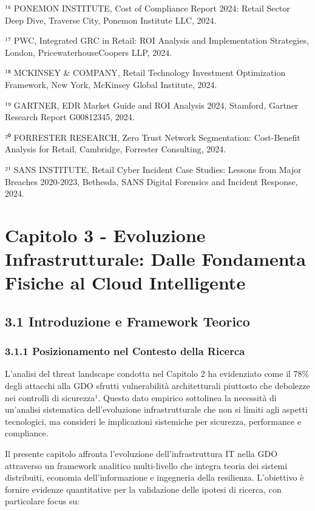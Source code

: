 \documentclass[12pt,a4paper,oneside]{book}
\numberwithin{figure}{chapter} %
\numberwithin{table}{chapter}  %
\begin{document}
¹⁶ PONEMON INSTITUTE, Cost of Compliance Report 2024: Retail Sector Deep
Dive, Traverse City, Ponemon Institute LLC, 2024.

¹⁷ PWC, Integrated GRC in Retail: ROI Analysis and Implementation
Strategies, London, PricewaterhouseCoopers LLP, 2024.

¹⁸ MCKINSEY \& COMPANY, Retail Technology Investment Optimization
Framework, New York, McKinsey Global Institute, 2024.

¹⁹ GARTNER, EDR Market Guide and ROI Analysis 2024, Stamford, Gartner
Research Report G00812345, 2024.

²⁰ FORRESTER RESEARCH, Zero Trust Network Segmentation: Cost-Benefit
Analysis for Retail, Cambridge, Forrester Consulting, 2024.

²¹ SANS INSTITUTE, Retail Cyber Incident Case Studies: Lessons from
Major Breaches 2020-2023, Bethesda, SANS Digital Forensics and Incident
Response, 2024.

\chapter{Capitolo 3 - Evoluzione Infrastrutturale: Dalle Fondamenta
Fisiche al Cloud
Intelligente}\label{capitolo-3---evoluzione-infrastrutturale-dalle-fondamenta-fisiche-al-cloud-intelligente}

\section{3.1 Introduzione e Framework
Teorico}\label{introduzione-e-framework-teorico}

\subsection{3.1.1 Posizionamento nel Contesto della
Ricerca}\label{posizionamento-nel-contesto-della-ricerca}

L'analisi del threat landscape condotta nel Capitolo 2 ha evidenziato
come il 78\% degli attacchi alla GDO sfrutti vulnerabilità
architetturali piuttosto che debolezze nei controlli di sicurezza¹.
Questo dato empirico sottolinea la necessità di un'analisi sistematica
dell'evoluzione infrastrutturale che non si limiti agli aspetti
tecnologici, ma consideri le implicazioni sistemiche per sicurezza,
performance e compliance.

Il presente capitolo affronta l'evoluzione dell'infrastruttura IT nella
GDO attraverso un framework analitico multi-livello che integra teoria
dei sistemi distribuiti, economia dell'informazione e ingegneria della
resilienza. L'obiettivo è fornire evidenze quantitative per la
validazione delle ipotesi di ricerca, con particolare focus su:
\end{document}
